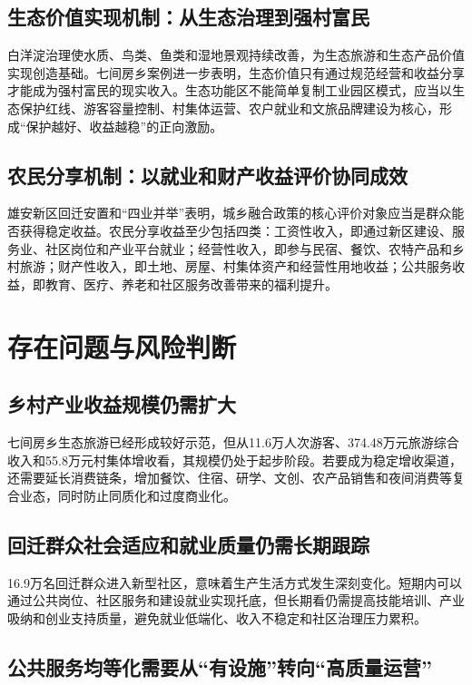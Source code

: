 \documentclass[UTF8,zihao=-4]{ctexart}
\begin{document}
\subsection{生态价值实现机制：从生态治理到强村富民}

白洋淀治理使水质、鸟类、鱼类和湿地景观持续改善，为生态旅游和生态产品价值实现创造基础。七间房乡案例进一步表明，生态价值只有通过规范经营和收益分享才能成为强村富民的现实收入。生态功能区不能简单复制工业园区模式，应当以生态保护红线、游客容量控制、村集体运营、农户就业和文旅品牌建设为核心，形成“保护越好、收益越稳”的正向激励。

\subsection{农民分享机制：以就业和财产收益评价协同成效}

雄安新区回迁安置和“四业并举”表明，城乡融合政策的核心评价对象应当是群众能否获得稳定收益。农民分享收益至少包括四类：工资性收入，即通过新区建设、服务业、社区岗位和产业平台就业；经营性收入，即参与民宿、餐饮、农特产品和乡村旅游；财产性收入，即土地、房屋、村集体资产和经营性用地收益；公共服务收益，即教育、医疗、养老和社区服务改善带来的福利提升。

\section{存在问题与风险判断}

\subsection{乡村产业收益规模仍需扩大}

七间房乡生态旅游已经形成较好示范，但从11.6万人次游客、374.48万元旅游综合收入和55.8万元村集体增收看，其规模仍处于起步阶段。若要成为稳定增收渠道，还需要延长消费链条，增加餐饮、住宿、研学、文创、农产品销售和夜间消费等复合业态，同时防止同质化和过度商业化。

\subsection{回迁群众社会适应和就业质量仍需长期跟踪}

16.9万名回迁群众进入新型社区，意味着生产生活方式发生深刻变化。短期内可以通过公共岗位、社区服务和建设就业实现托底，但长期看仍需提高技能培训、产业吸纳和创业支持质量，避免就业低端化、收入不稳定和社区治理压力累积。

\subsection{公共服务均等化需要从“有设施”转向“高质量运营”}
\end{document}
